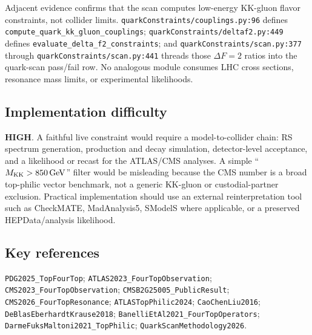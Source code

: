 Adjacent evidence confirms that the scan computes low-energy KK-gluon flavor
constraints, not collider limits.  \texttt{quarkConstraints/couplings.py:96}
defines \texttt{compute\_quark\_kk\_gluon\_couplings};
\texttt{quarkConstraints/deltaf2.py:449} defines
\texttt{evaluate\_delta\_f2\_constraints}; and
\texttt{quarkConstraints/scan.py:377} through \texttt{quarkConstraints/scan.py:441}
threads those \(\Delta F=2\) ratios into the quark-scan pass/fail row.  No
analogous module consumes LHC cross sections, resonance mass limits, or
experimental likelihoods.

\subsection*{Implementation difficulty}
\textbf{HIGH}.  A faithful live constraint would require a model-to-collider
chain: RS spectrum generation, production and decay simulation, detector-level
acceptance, and a likelihood or recast for the ATLAS/CMS analyses.  A simple
``\(M_{\rm KK}>850\,\mathrm{GeV}\)'' filter would be misleading because the CMS
number is a broad top-philic vector benchmark, not a generic KK-gluon or
custodial-partner exclusion.  Practical implementation should use an external
reinterpretation tool such as CheckMATE, MadAnalysis5, SModelS where applicable,
or a preserved HEPData/analysis likelihood.

\subsection*{Key references}
\texttt{PDG2025\_TopFourTop};
\texttt{ATLAS2023\_FourTopObservation};
\texttt{CMS2023\_FourTopObservation};
\texttt{CMSB2G25005\_PublicResult};
\texttt{CMS2026\_FourTopResonance};
\texttt{ATLASTopPhilic2024};
\texttt{CaoChenLiu2016};
\texttt{DeBlasEberhardtKrause2018};
\texttt{BanelliEtAl2021\_FourTopOperators};
\texttt{DarmeFuksMaltoni2021\_TopPhilic};
\texttt{QuarkScanMethodology2026}.
